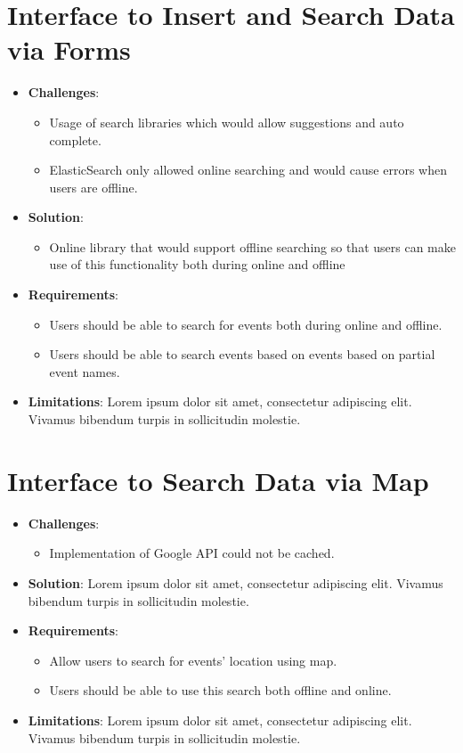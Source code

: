 \documentclass[11pt, a4paper]{article}
\begin{document}
\section{Interface to Insert and Search Data via Forms}
\begin{itemize}
  \item \textbf{Challenges}: 
  \begin{itemize}
    \item Usage of search libraries which would allow suggestions and auto complete. 
    \item ElasticSearch only allowed online searching and would cause errors when users are offline.
  \end{itemize}
  \item \textbf{Solution}: 
  \begin{itemize}
    \item Online library that would support offline searching so that users can make use of this 
    functionality both during online and offline
  \end{itemize}
  \item \textbf{Requirements}: 
  \begin{itemize}
    \item Users should be able to search for events both during online and offline.
    \item Users should be able to search events based on events based on partial event names.
  \end{itemize}
  
  \item \textbf{Limitations}: Lorem ipsum dolor sit amet, consectetur adipiscing elit. Vivamus
  bibendum turpis in sollicitudin molestie.
\end{itemize}

\section{Interface to Search Data via Map}
\begin{itemize}
  \item \textbf{Challenges}:
  \begin{itemize}
    \item Implementation of Google API could not be cached. 
  \end{itemize}
  \item \textbf{Solution}: Lorem ipsum dolor sit amet, consectetur adipiscing elit. Vivamus bibendum
  turpis in sollicitudin molestie.
  \item \textbf{Requirements}: 
  \begin{itemize}
    \item Allow users to search for events' location using map.
    \item Users should be able to use this search both offline and online.
  \end{itemize}
  \item \textbf{Limitations}: Lorem ipsum dolor sit amet, consectetur adipiscing elit. Vivamus
  bibendum turpis in sollicitudin molestie.
\end{itemize}
\end{document}

